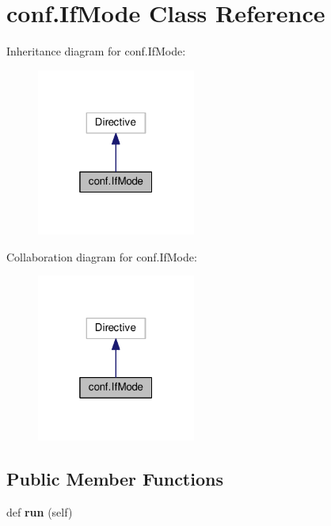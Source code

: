 \hypertarget{classconf_1_1IfMode}{}\section{conf.\+If\+Mode Class Reference}
\label{classconf_1_1IfMode}


Inheritance diagram for conf.\+If\+Mode\+:
\nopagebreak
\begin{figure}[H]
\begin{center}
\leavevmode
\includegraphics[width=148pt]{classconf_1_1IfMode__inherit__graph}
\end{center}
\end{figure}


Collaboration diagram for conf.\+If\+Mode\+:
\nopagebreak
\begin{figure}[H]
\begin{center}
\leavevmode
\includegraphics[width=148pt]{classconf_1_1IfMode__coll__graph}
\end{center}
\end{figure}
\subsection*{Public Member Functions}
\begin{DoxyCompactItemize}
\item 
def {\bfseries run} (self)\hypertarget{classconf_1_1IfMode_a8734a7a8ad5f3c9832d0856b8470871c}{}\label{classconf_1_1IfMode_a8734a7a8ad5f3c9832d0856b8470871c}

\end{DoxyCompactItemize}
